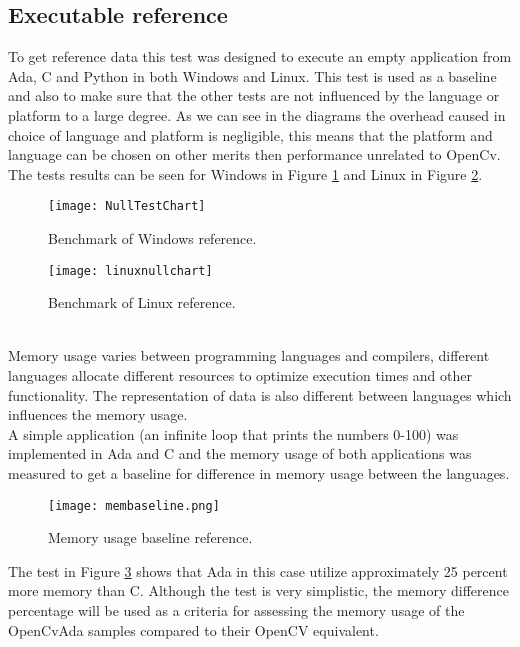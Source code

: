 \subsection{Executable reference}\label{sec:execref}
To get reference data this test was designed to execute an empty application from Ada, C and Python in both Windows and Linux. This test is used as a baseline and also to make sure that the other tests are not influenced by the language or platform to a large degree. As we can see in the diagrams the overhead caused in choice of language and platform is negligible, this means that the platform and language can be chosen on other merits then performance unrelated to OpenCv. The tests results can be seen for Windows in Figure \ref{fig:NullTestChart} and Linux in Figure \ref{fig:linuxnullchart}.
\begin{figure}
\centering
\texttt{[image: NullTestChart]}
\caption{Benchmark of Windows reference.}
\label{fig:NullTestChart}
\end{figure}
\begin{figure}
\centering
\texttt{[image: linuxnullchart]}
\caption{Benchmark of Linux reference.}
\label{fig:linuxnullchart}
\end{figure}
\\
Memory usage varies between programming languages and compilers, different languages allocate different resources to optimize execution times and other functionality. The representation of data is also different between languages which influences the memory usage.
\\
A simple application (an infinite loop that prints the numbers 0-100) was implemented in Ada and C and the memory usage of both applications was measured to get a baseline for difference in memory usage between the languages.
\\
\begin{figure}
\centering
\texttt{[image: membaseline.png]}
\caption{Memory usage baseline reference.}
\label{fig:membaseline}
\end{figure}
The test in Figure \ref{fig:membaseline} shows that Ada in this case utilize approximately 25 percent more memory than C. Although the test is very simplistic, the memory difference percentage will be used as a criteria for assessing the memory usage of the OpenCvAda samples compared to their OpenCV equivalent.
